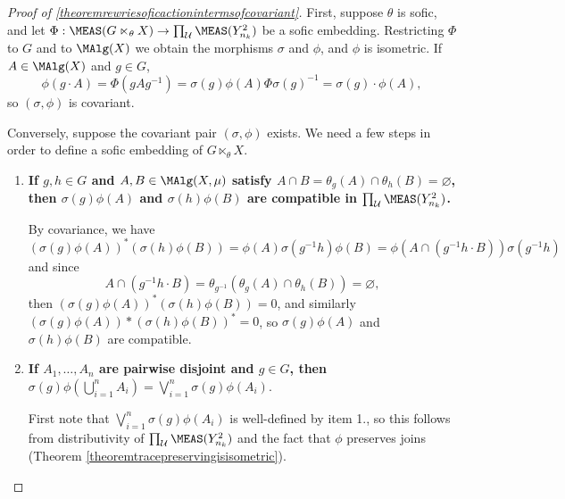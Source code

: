 \begin{proof}[Proof of \ref{theoremrewriesoficactionintermsofcovariant}]
First, suppose $\theta$ is sofic, and let $\Phi:\MEAS(G\ltimes_\theta X)\to\prod_\mathcal{U}\MEAS(Y_{n_k}^2)$ be a sofic embedding. Restricting $\Phi$ to $G$ and to $\MAlg(X)$ we obtain the morphisms $\sigma$ and $\phi$, and $\phi$ is isometric. If $A\in\MAlg(X)$ and $g\in G$,
\[\phi(g\cdot A)=\Phi(gAg^{-1})=\sigma(g)\phi(A)\Phi\sigma(g)^{-1}=\sigma(g)\cdot\phi(A),\]
so $(\sigma,\phi)$ is covariant.

Conversely, suppose the covariant pair $(\sigma,\phi)$ exists. We need a few steps in order to define a sofic embedding of $G\ltimes_\theta X$.

\begin{enumerate}
\item {\bf{If $g,h\in G$ and $A,B\in\MAlg(X,\mu)$ satisfy $A\cap B=\theta_g(A)\cap\theta_h(B)=\varnothing$, then $\sigma(g)\phi(A)$ and $\sigma(h)\phi(B)$ are compatible in $\prod_\mathcal{U}\MEAS(Y_{n_k}^2)$.}}%

By covariance, we have
\[\left(\sigma(g)\phi(A)\right)^*\left(\sigma(h)\phi(B)\right)=\phi(A)\sigma(g^{-1}h)\phi(B)=\phi(A\cap(g^{-1}h\cdot B))\sigma(g^{-1}h)\]
and since
\[A\cap(g^{-1}h\cdot B)=\theta_{g^{-1}}(\theta_g(A)\cap\theta_h(B))=\varnothing,\]
then $\left(\sigma(g)\phi(A)\right)^*\left(\sigma(h)\phi(B)\right)=0$, and similarly $\left(\sigma(g)\phi(A)\right)*\left(\sigma(h)\phi(B)\right)^*=0$, so $\sigma(g)\phi(A)$ and $\sigma(h)\phi(B)$ are compatible.

\item {\bf{If $A_1,\ldots,A_n$ are pairwise disjoint and $g\in G$, then $\sigma(g)\phi(\bigcup_{i=1}^n A_i)=\bigvee_{i=1}^n\sigma(g)\phi(A_i)$}}.

First note that $\bigvee_{i=1}^n\sigma(g)\phi(A_i)$ is well-defined by item 1., so this follows from distributivity of $\prod_\mathcal{U}\MEAS(Y_{n_k}^2)$ and the fact that $\phi$ preserves joins (Theorem \ref{theoremtracepreservingisisometric}).
\end{enumerate}


\end{proof}
